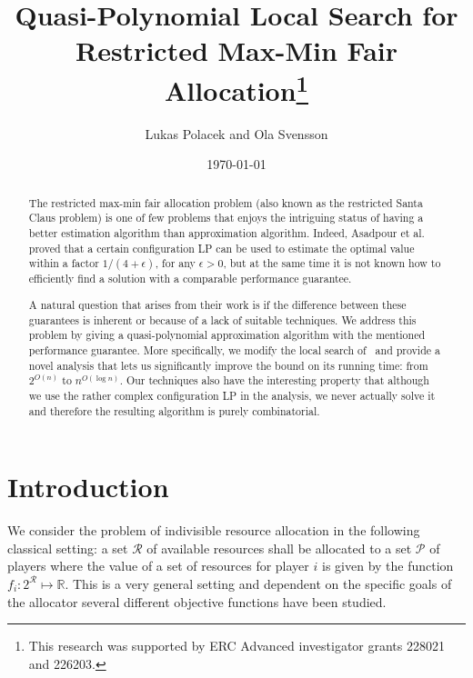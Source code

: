 \documentclass{llncs}
\title{Quasi-Polynomial Local Search for Restricted Max-Min Fair Allocation\thanks{This research was supported by ERC Advanced investigator grants 228021 and 226203.}}
\author{Lukas Polacek\inst{1} and Ola Svensson\inst{2}}
\institute{KTH Royal Institute of Technology, Sweden
  \email{polacek@csc.kth.se}
  \and EPFL, Switzerland
  \email{ola.svensson@epfl.ch}
}
\date{\today}
\newcommand{\res}{\ensuremath{\mathcal{R}}\xspace}
\newcommand{\players}{\ensuremath{\mathcal{P}}\xspace}
\begin{document}
\maketitle

\begin{abstract}
The restricted max-min fair allocation problem (also known as the
restricted Santa Claus problem) is one of few problems that enjoys the
intriguing status of having a better estimation algorithm than
approximation algorithm. Indeed, Asadpour et al.~\cite{AFS08} proved
that a certain configuration LP can be used to estimate the optimal
value within a factor ${1}/{(4+\epsilon)}$, for any $\epsilon>0$, but at
the same time it is not known how to efficiently find a solution with
a comparable performance guarantee.

A natural question that arises from their work is if the difference
between these guarantees is inherent or because of a lack of suitable
techniques. We address this problem by giving a quasi-polynomial
approximation algorithm with the mentioned performance guarantee. More
specifically, we modify the local search of~\cite{AFS08} and provide a
novel analysis that lets us significantly improve the bound on its
running time: from $2^{O(n)}$ to $n^{O(\log n)}$. Our techniques also
have the interesting property that although we use the rather complex
configuration LP in the analysis, we never actually solve it and
therefore the resulting algorithm is purely combinatorial.
\end{abstract}

\section{Introduction}


We consider the problem of indivisible resource allocation in the
following classical setting: a set \res of available resources shall
be allocated to a set \players of players where the value of a set of
resources for player $i$ is given by the function $f_i : 2^\res
\mapsto \mathbb{R}$.
This is a very general setting and dependent on the specific goals of
the allocator several different objective functions have been studied.
\end{document}
